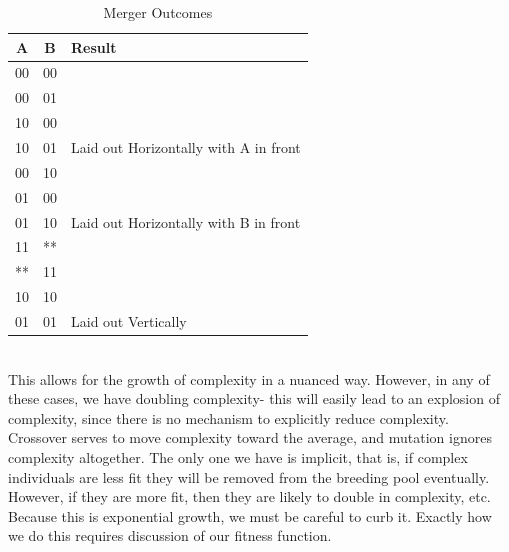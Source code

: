 \begin{table}
	\centering
\begin{tabular}{|c c | l|}
	\hline
	A & B & Result\\
	\hline
	00 & 00 & \\
	00 & 01 &\\
	10 & 00 &\\
	10 & 01 &Laid out Horizontally with A in front\\
	\hline
	00 & 10&\\
	01 & 00&\\
	01 & 10& Laid out Horizontally with B in front\\
	\hline
	11 & ** & \\
	** & 11 & \\
	10 & 10 & \\
	01 & 01 & Laid out Vertically\\
	\hline	
\end{tabular}
\caption{Merger Outcomes} \label{tab:merger}
\end{table}	\\
This allows for the growth of complexity in a nuanced way.  However, in any of these cases, we have doubling complexity- this will easily lead to an explosion of complexity, since there is no mechanism to explicitly reduce complexity.    Crossover serves to move complexity toward the average, and mutation ignores complexity altogether.  The only one we have is implicit, that is, if complex individuals are less fit they will be removed from the breeding pool eventually.  However, if they are more fit, then they are likely to double in complexity, etc.  Because this is exponential growth, we must be careful to curb it.  Exactly how we do this requires discussion of our fitness function.\\
